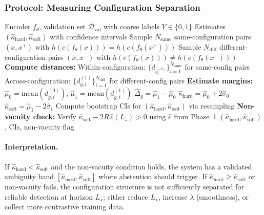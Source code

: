 \documentclass[11pt]{article}
\begin{document}
\subsubsection{Protocol: Measuring Configuration Separation}

\begin{algorithm}[H]
\caption{Margin Estimation on Validation Pairs}
\label{alg:margin-estimation}
\begin{algorithmic}[1]
\Require Encoder $f_\theta$, validation set $\mathcal{D}_{\mathrm{val}}$ with coarse labels $Y \in \{0,1\}$
\Ensure Estimates $(\hat\kappa_{\mathrm{hard}}, \hat\kappa_{\mathrm{soft}})$ with confidence intervals
\State Sample $N_{\mathrm{same}}$ same-configuration pairs $(x,x^+)$ with $h(c(f_\theta(x))) = h(c(f_\theta(x^+)))$
\State Sample $N_{\mathrm{diff}}$ different-configuration pairs $(x,x^-)$ with $h(c(f_\theta(x))) \neq h(c(f_\theta(x^-)))$
\State \textbf{Compute distances:}
\State \quad Within-configuration: $\{d_{g^{(0)}_i}\}_{i=1}^{N_{\mathrm{same}}}$ for same-config pairs
\State \quad Across-configuration: $\{d_{g,i}^{(1)}\}_{i=1}^{N_{\mathrm{diff}}}$ for different-config pairs
\State \textbf{Estimate margins:}
\State \quad $\hat\mu_0 = \text{mean}(d_{g,i}^{(0)})$, \quad $\hat\mu_1 = \text{mean}(d_{g,i}^{(1)})$
\State \quad $\hat\Delta_g = \hat\mu_1 - \hat\mu_0$
\State \quad $\hat\kappa_{\mathrm{hard}} = \hat\mu_0 + 2\hat\sigma_0$ \quad {}
\State \quad $\hat\kappa_{\mathrm{soft}} = \hat\mu_1 - 2\hat\sigma_1$ \quad {}
\State Compute bootstrap CIs for $(\hat\kappa_{\mathrm{hard}}, \hat\kappa_{\mathrm{soft}})$ via resampling
\State \textbf{Non-vacuity check:} Verify $\hat\kappa_{\mathrm{soft}} - 2R\,\hat\varepsilon(L_\star) > 0$ using $\hat\varepsilon$ from Phase~1
\State \Return $(\hat\kappa_{\mathrm{hard}}, \hat\kappa_{\mathrm{soft}})$, CIs, non-vacuity flag
\end{algorithmic}
\end{algorithm}

\paragraph{Interpretation.}
If $\hat\kappa_{\mathrm{hard}} < \hat\kappa_{\mathrm{soft}}$ and the non-vacuity condition holds, the system has a validated ambiguity band $[\hat\kappa_{\mathrm{hard}}, \hat\kappa_{\mathrm{soft}}]$ where abstention should trigger. If $\hat\kappa_{\mathrm{hard}} \ge \hat\kappa_{\mathrm{soft}}$ or non-vacuity fails, the configuration structure is not sufficiently separated for reliable detection at horizon $L_\star$; either reduce $L_\star$, increase $\lambda$ (smoothness), or collect more contrastive training data.
\end{document}
